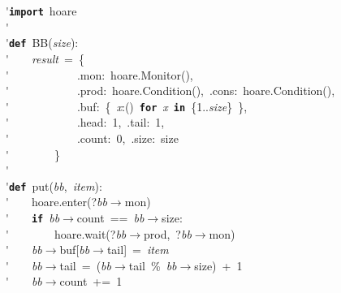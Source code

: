 \'\>\texttt{\textbf{import}}~hoare\\

\'\>\\

\'\>\texttt{\textbf{def}}~BB(\textit{size}):\\

\'\>~~~~\textit{result}~=~\{\\

\'\>~~~~~~~~~~~~.mon:~hoare.Monitor(),\\

\'\>~~~~~~~~~~~~.prod:~hoare.Condition(),~.cons:~hoare.Condition(),\\

\'\>~~~~~~~~~~~~.buf:~\{~\textit{x}:()~\texttt{\textbf{for}}~\textit{x}~\texttt{\textbf{in}}~\{1..\textit{size}\}~\},\\

\'\>~~~~~~~~~~~~.head:~1,~.tail:~1,\\

\'\>~~~~~~~~~~~~.count:~0,~.size:~size\\

\'\>~~~~~~~~\}\\

\'\>~~~~\\

\'\>\texttt{\textbf{def}}~put(\textit{bb},~\textit{item}):\\

\'\>~~~~hoare.enter(?\textit{bb}$\rightarrow$mon)\\

\'\>~~~~\texttt{\textbf{if}}~\textit{bb}$\rightarrow$count~==~\textit{bb}$\rightarrow$size:\\

\'\>~~~~~~~~hoare.wait(?\textit{bb}$\rightarrow$prod,~?\textit{bb}$\rightarrow$mon)\\

\'\>~~~~\textit{bb}$\rightarrow$buf[\textit{bb}$\rightarrow$tail]~=~\textit{item}\\

\'\>~~~~\textit{bb}$\rightarrow$tail~=~(\textit{bb}$\rightarrow$tail~\%~\textit{bb}$\rightarrow$size)~+~1\\

\'\>~~~~\textit{bb}$\rightarrow$count~+=~1\\

